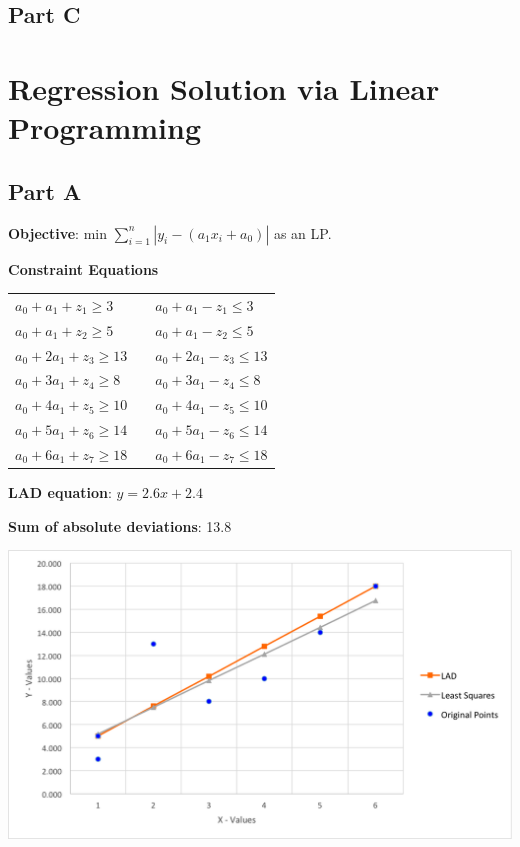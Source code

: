 \documentclass[11pt,letterpaper]{article}
\begin{document}
\subsection*{Part C}


\section{Regression Solution via Linear Programming}
\subsection*{Part A}
\textbf{Objective}: min $\sum\limits_{i=1}^n |y_i -  (a_1x_i + a_0)|$ as an LP.\vspace{8pt}

\textbf{Constraint Equations}

\begin{tabular}{l l l}
$a_0+a_1+z_1\geq3$	&  & $a_0+a_1-z_1\leq3$\\
$a_0+a_1+z_2\geq5$ 	& & $a_0+a_1-z_2\leq5$\\
$a_0+2a_1+z_3\geq13$	& & $a_0+2a_1-z_3\leq13$\\
$a_0+3a_1+z_4\geq8$	& & $a_0+3a_1-z_4\leq8$\\
$a_0+4a_1+z_5\geq10$	& & $a_0+4a_1-z_5\leq10$\\
$a_0+5a_1+z_6\geq14$	& & $a_0+5a_1-z_6\leq14$\\
$a_0+6a_1+z_7\geq18$	& & $a_0+6a_1-z_7\leq18$\\
\end{tabular}\vspace{8pt}

\textbf{LAD equation}: $y = 2.6x + 2.4$\vspace{8pt}

\textbf{Sum of absolute deviations}: 13.8\vspace{8pt}


\centerline{\includegraphics[width=7in]{lad.png}}
\end{document}
